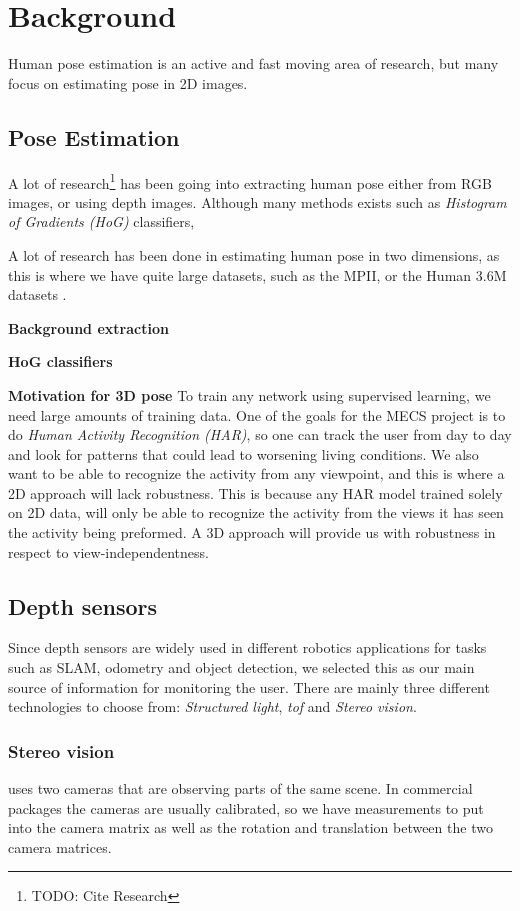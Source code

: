 \chapter{Background}

Human pose estimation is an active and fast moving area of research, but many focus on estimating pose in 2D images. 

\section{Pose Estimation}

A lot of research\footnote{TODO: Cite Research} has been going into extracting human pose either from RGB images, or using depth images. Although many methods exists such as \emph{Histogram of Gradients (HoG)} classifiers,

A lot of research has been done in estimating human pose in two dimensions, as this is where we have quite large datasets, such as the MPII, or the Human 3.6M datasets \cite{andriluka14cvpr,h36m_pami}.

\textbf{Background extraction}

\textbf{HoG classifiers}


\textbf{Motivation for 3D pose} To train any network using supervised learning, we need large amounts of training data. One of the goals for the MECS project is to do \emph{Human Activity Recognition (HAR)}, so one can track the user from day to day and look for patterns that could lead to worsening living conditions. We also want to be able to recognize the activity from any viewpoint, and this is where a 2D approach will lack robustness. This is because any HAR model trained solely on 2D data, will only be able to recognize the activity from the views it has seen the activity being preformed. A 3D approach will provide us with robustness in respect to view-independentness.

\section{Depth sensors}

Since depth sensors are widely used in different robotics applications for tasks such as SLAM, odometry and object detection, we selected this as our main source of information for monitoring the user. There are mainly three different technologies to choose from: \emph{Structured light}, \emph{\gls{tof}} and \emph{Stereo vision}. 

\subsection{Stereo vision} uses two cameras that are observing parts of the same scene. In commercial packages the cameras are usually calibrated, so we have measurements to put into the camera matrix as well as the rotation and translation between the two camera matrices.

